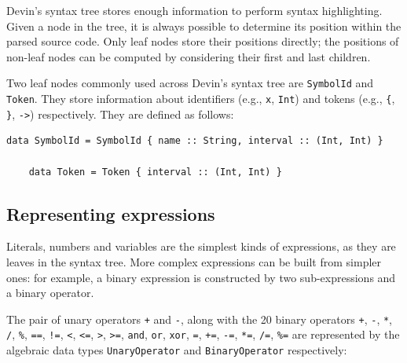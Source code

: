 \documentclass[UdineBachThesis,american,11pt]{PhdThesis}
\begin{document}
  Devin's syntax tree stores enough information to perform syntax highlighting.
  Given a node in the tree, it is always possible to determine its position
  within the parsed source code. Only leaf nodes store their positions directly;
  the positions of non-leaf nodes can be computed by considering their first and
  last children.

  Two leaf nodes commonly used across Devin's syntax tree are
  \mbox{\texttt{SymbolId}} and \mbox{\texttt{Token}}. They store information
  about identifiers (e.g., \texttt{x}, \mbox{\texttt{Int}}) and tokens (e.g.,
  \texttt{\{}, \texttt{\}}, \mbox{\texttt{->}}) respectively. They are defined
  as follows:

  \begin{Verbatim}[gobble=4,fontsize=\small]
    data SymbolId = SymbolId { name :: String, interval :: (Int, Int) }

    data Token = Token { interval :: (Int, Int) }
  \end{Verbatim}

  \newpage

  \subsection{Representing expressions}

  Literals, numbers and variables are the simplest kinds of expressions, as they
  are leaves in the syntax tree. More complex expressions can be built from
  simpler ones: for example, a binary expression is constructed by two
  sub-expressions and a binary operator.

  The pair of unary operators \texttt{+} and \texttt{-}, along with the 20
  binary operators \texttt{+}, \texttt{-}, \texttt{*}, \texttt{/}, \texttt{\%},
  \mbox{\texttt{==}}, \mbox{\texttt{!=}}, \texttt{<}, \mbox{\texttt{<=}},
  \texttt{>}, \mbox{\texttt{>=}}, \mbox{\texttt{and}}, \mbox{\texttt{or}},
  \mbox{\texttt{xor}}, \texttt{=}, \mbox{\texttt{+=}}, \mbox{\texttt{-=}},
  \mbox{\texttt{*=}}, \mbox{\texttt{/=}}, \mbox{\texttt{\%=}} are represented by
  the algebraic data types \mbox{\texttt{UnaryOperator}} and
  \mbox{\texttt{BinaryOperator}} respectively:
\end{document}
